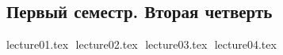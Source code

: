 \documentclass[12pt,letterpaper]{report}
\theoremstyle{definition}
\begin{document}
\tableofcontents
\newpage
\begin{normalsize}
\chapter*{Первый семестр. Вторая четверть}
{lecture01.tex}
$ $
{lecture02.tex}
$ $
{lecture03.tex}
$ $
{lecture04.tex}
$ $
\end{normalsize}
\end{document}
